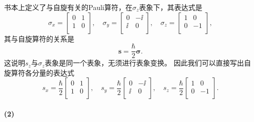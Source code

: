 \begin{tcolorbox}[breakable, title={\textbf{自旋}}]
    书本上定义了与自旋有关的Pauli算符，在$\sigma_z$表象下，其表达式是
    \begin{equation}
        \sigma_x =
        \begin{bmatrix}
            0 & 1 \\ 1 & 0\\
        \end{bmatrix},\quad
        \sigma_y =
        \begin{bmatrix}
            0 & -\ii \\ \ii & 0\\
        \end{bmatrix},\quad
        \sigma_z =
        \begin{bmatrix}
            1 & 0 \\ 0 & -1\\
        \end{bmatrix},
    \end{equation}
    其与自旋算符的关系是
    \begin{equation}
        \bm{s} = \frac{\hbar}{2} \bm{\sigma}.
    \end{equation}
    这说明$s_z$与$\sigma_z$表象是同一个表象，无须进行表象变换。
    因此我们可以直接写出自旋算符各分量的表达式
    \begin{equation}
        s_x = \frac{\hbar}{2}
        \begin{bmatrix}
            0 & 1 \\ 1 & 0\\
        \end{bmatrix},\quad
        s_y = \frac{\hbar}{2}
        \begin{bmatrix}
            0 & -\ii \\ \ii & 0\\
        \end{bmatrix},\quad
        s_z = \frac{\hbar}{2}
        \begin{bmatrix}
            1 & 0 \\ 0 & -1\\
        \end{bmatrix}.
    \end{equation}

    \paragraph{(2)}


\end{tcolorbox}

